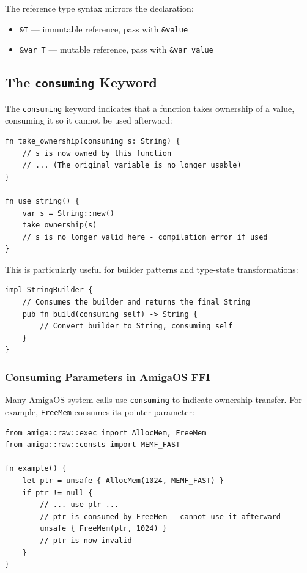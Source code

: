 The reference type syntax mirrors the declaration:
\begin{itemize}
    \item \texttt{\&T} --- immutable reference, pass with \texttt{\&value}
    \item \texttt{\&var T} --- mutable reference, pass with \texttt{\&var value}
\end{itemize}

\subsection{The \texttt{consuming} Keyword}
\label{subsec:consuming}

The \texttt{consuming} keyword indicates that a function takes ownership of a value, consuming it so it cannot be used afterward:

\begin{lstlisting}
fn take_ownership(consuming s: String) {
    // s is now owned by this function
    // ... (The original variable is no longer usable)
}

fn use_string() {
    var s = String::new()
    take_ownership(s)
    // s is no longer valid here - compilation error if used
}
\end{lstlisting}

This is particularly useful for builder patterns and type-state transformations:

\begin{lstlisting}
impl StringBuilder {
    // Consumes the builder and returns the final String
    pub fn build(consuming self) -> String {
        // Convert builder to String, consuming self
    }
}
\end{lstlisting}

\subsubsection{Consuming Parameters in AmigaOS FFI}

Many AmigaOS system calls use \texttt{consuming} to indicate ownership transfer. For example, \texttt{FreeMem} consumes its pointer parameter:

\begin{lstlisting}
from amiga::raw::exec import AllocMem, FreeMem
from amiga::raw::consts import MEMF_FAST

fn example() {
    let ptr = unsafe { AllocMem(1024, MEMF_FAST) }
    if ptr != null {
        // ... use ptr ...
        // ptr is consumed by FreeMem - cannot use it afterward
        unsafe { FreeMem(ptr, 1024) }
        // ptr is now invalid
    }
}
\end{lstlisting}

